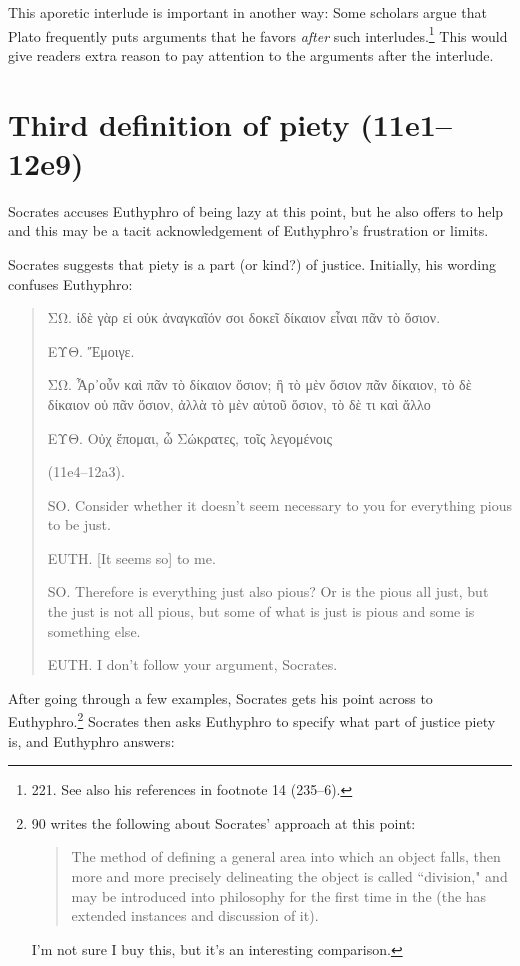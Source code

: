 \documentclass[12pt]{article}
\begin{document}
This aporetic interlude is important in another way: Some scholars argue that
Plato frequently puts arguments that he favors \emph{after} such
interludes.\footnote{\citet{mcpherran1992} 221.  See also his references in
footnote 14 (235--6).}  This would give readers extra reason to pay attention
to the arguments after the interlude.


\section{Third definition of piety (11e1--12e9)}

Socrates accuses Euthyphro of being lazy at this point, but he also offers to
help and this may be a tacit acknowledgement of Euthyphro's frustration or
limits.

Socrates suggests that piety is a part (or kind?) of justice. Initially, his
wording confuses Euthyphro:

\begin{quote}

    {\g ΣΩ. ἰδὲ γὰρ εἰ οὐκ ἀναγκαῖόν σοι δοκεῖ δίκαιον εἶναι πᾶν τὸ ὅσιον.

    ΕΥΘ. Ἔμοιγε.

    ΣΩ. Ἆρ᾽οὖν καὶ πᾶν τὸ δίκαιον ὅσιον; ἢ τὸ μὲν ὅσιον πᾶν δίκαιον, τὸ δὲ
    δίκαιον οὐ πᾶν ὅσιον, ἀλλὰ τὸ μὲν αὐτοῦ ὅσιον, τὸ δὲ τι καὶ ἄλλο

    ΕΥΘ. Οὐχ ἕπομαι, ὦ Σώκρατες, τοῖς λεγομένοις} (11e4--12a3).

    SO. Consider whether it doesn't seem necessary to you for everything pious
    to be just.

    EUTH. [It seems so] to me.

    SO. Therefore is everything just also pious? Or is the pious all just, but
    the just is not all pious, but some of what is just is pious and some is
    something else.

    EUTH. I don't follow your argument, Socrates.

\end{quote}

After going through a few examples, Socrates gets his point across to
Euthyphro.\footnote{\citet{bailly2003} 90 writes the following about Socrates'
approach at this point:

\begin{quote}

    The method of defining a general area into which an object falls, then more
    and more precisely delineating the object is called ``division," and may be
    introduced into philosophy for the first time in the  (the
     has extended instances and discussion of it).

\end{quote}

I'm not sure I buy this, but it's an interesting comparison.}  Socrates then
asks Euthyphro to specify what part of justice piety is, and Euthyphro answers:
\end{document}
